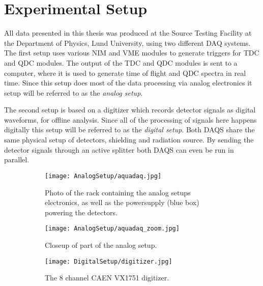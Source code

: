 \documentclass[main.tex]{subfiles}
\begin{document}
\section{Experimental Setup}
All data presented in this thesis was produced at the Source Testing Facility at the Department of Physics, Lund University, using two different DAQ systems. The first setup uses various NIM and VME modules to generate triggers for TDC and QDC modules. The output of the TDC and QDC modules is sent to a computer, where it is used to generate time of flight and QDC spectra in real time. Since this setup does most of the data processing via analog electronics it setup will be referred to as the \textit{analog setup}. 

The second setup is based on a digitizer which records detector signals as digital waveforms, for offline analysis. Since all of the processing of signals here happens digitally this setup will be referred to as the \textit{digital setup}. 
Both DAQS share the same physical setup of detectors, shielding and radiation source. By sending the detector signals through an active splitter both DAQS can even be run in parallel.


\begin{figure}[ht]
	\begin{subfigure}[b]{0.5\textwidth}
	    \centering
			\captionsetup{width=.80\linewidth}	
    	    \texttt{[image: AnalogSetup/aquadaq.jpg]}
        	\caption[Photograph of analog DAQ electronics]{Photo of the rack containing the analog setups electronics, as well as the powersupply (blue box) powering the detectors.}
	    \label{fig:aquadaq_image} 
	\end{subfigure}
	\begin{subfigure}[b]{0.24\textwidth}
	    \centering
	    	\captionsetup{width=1\linewidth}	
    	    \texttt{[image: AnalogSetup/aquadaq\_zoom.jpg]}
        	\caption[Photograph of analog VME modules]{Closeup of part of the analog setup.}
	    \label{fig:aquadaq_zoom_image} 
	\end{subfigure}
	\begin{subfigure}[b]{0.24\textwidth}
    	\centering
			\captionsetup{width=.6\linewidth}	
        	\texttt{[image: DigitalSetup/digitizer.jpg]}
        	\caption[Photograph of the CAEN VX1751 digitizer]{The 8 channel CAEN VX1751 digitizer.}
    	\label{fig:digitizer_image} 
    \end{subfigure}
    \caption[Photograps of the analog DAQ setup and the digitizer.]{}
\end{figure}
\end{document}
